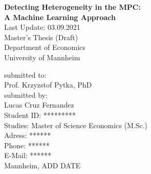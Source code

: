 \begin{titlepage}

\begin{center}

\vspace*{1,2cm}

\huge {\bfseries Detecting Heterogeneity in the MPC: \\ A Machine Learning Approach}\\[1.8cm]
\Large {Last Update: 03.09.2021}\\[1cm]

\Large {Master's Thesis (Draft)}\\[1cm]
\large {Department of Economics}\\[0.2cm]

\large {University of Mannheim}\\[0.5cm]

\end{center}

\vfill

\noindent submitted to:\\
Prof. Krzyzstof Pytka, PhD\\[1cm]
submitted by:\\
Lucas Cruz Fernandez\\[1cm]
Student ID: *********\\
Studies: Master of Science Economics (M.Sc.)\\[1cm]
Adress: ****** \\
Phone: ****** \\
E-Mail: ****** \\[1cm]
Mannheim, ADD DATE

\setcounter{page}{0}

\end{titlepage}
